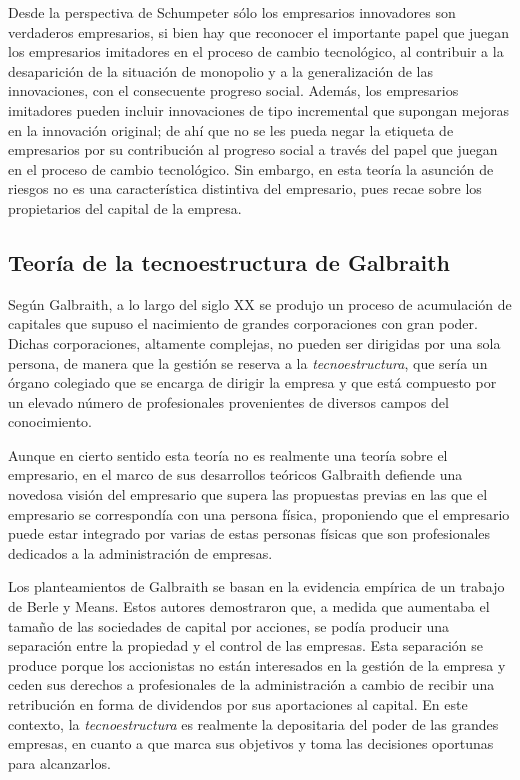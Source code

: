 \documentclass[12pt,a4paper,spanish]{report}
\begin{document}
			 Desde la perspectiva de Schumpeter sólo los empresarios innovadores son verdaderos empresarios, si bien hay que reconocer el importante papel que juegan los empresarios imitadores en el proceso de cambio tecnológico, al contribuir a la desaparición de la situación de monopolio y a la generalización de las innovaciones, con el consecuente progreso social. Además, los empresarios imitadores pueden incluir innovaciones de tipo incremental que supongan mejoras en la innovación original; de ahí que no se les pueda negar la etiqueta de empresarios por su contribución al progreso social a través del papel que juegan en el proceso de cambio tecnológico. Sin embargo, en esta teoría la asunción de riesgos no es una característica distintiva del empresario, pues recae sobre los propietarios del capital de la empresa.
		\newpage
		\subsection{\textcolor[rgb]{0.9,0.3,0.3}Teoría de la tecnoestructura de Galbraith}
			Según Galbraith, a lo largo del siglo XX se produjo un proceso de acumulación de capitales que supuso el nacimiento de grandes corporaciones con gran poder. Dichas corporaciones, altamente complejas, no pueden ser dirigidas por una sola persona, de manera que la gestión se reserva a la \textcolor[rgb]{0.9,0.3,0.3}{\emph{tecnoestructura}}, que sería un órgano colegiado que se encarga de dirigir la empresa y que está compuesto por un elevado número de profesionales provenientes de diversos campos del conocimiento.

			Aunque en cierto sentido esta teoría no es realmente una teoría sobre el empresario, en el marco de sus desarrollos teóricos Galbraith defiende una novedosa visión del empresario que supera las propuestas previas en las que el empresario se correspondía con una persona física, proponiendo que el empresario puede estar integrado por varias de estas personas físicas que son profesionales dedicados a la administración de empresas.

			Los planteamientos de Galbraith se basan en la evidencia empírica de un trabajo de Berle y Means. Estos autores demostraron que, a medida que aumentaba el tamaño de las sociedades de capital por acciones, se podía producir una separación entre la propiedad y el control de las empresas. Esta separación se produce porque los accionistas no están interesados en la gestión de la empresa y ceden sus derechos a profesionales de la administración a cambio de recibir una retribución en forma de dividendos por sus aportaciones al capital. En este contexto, la \textcolor[rgb]{0.9,0.3,0.3}{\emph{tecnoestructura}} es realmente la depositaria del poder de las grandes empresas, en cuanto a que marca sus objetivos y toma las decisiones oportunas para alcanzarlos.
\end{document}
